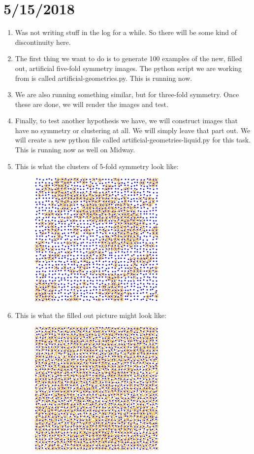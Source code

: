 \documentclass[12pt,reqno]{amsart}
\numberwithin{equation}{section}
\begin{document}
\section{5/15/2018}
\begin{enumerate}
\item Was not writing stuff in the log for a while.  So there will be some kind of discontinuity here. 
\item The first thing we want to do is to generate 100 examples of the new, filled out, artificial five-fold symmetry images.  The python script we are working from is called artificial-geometries.py.  This is running now.
\item We are also running something similar, but for three-fold symmetry.  Once these are done, we will render the images and test.
\item Finally, to test another hypothesis we have, we will construct images that have no symmetry or clustering at all.  We will simply leave that part out.  We will create a new python file called artificial-geometries-liquid.py for this task.  This is running now as well on Midway.
\item This is what the clusters of 5-fold symmetry look like:
\begin{figure}[H]
\centering
\includegraphics[scale=0.6]{5-fold-clusters}
\end{figure}
\item This is what the filled out picture might look like: 
\begin{figure}[H]
\centering
\includegraphics[scale=0.6]{5-fold-clusters-full}

\end{figure}
\end{enumerate}
\end{document}
